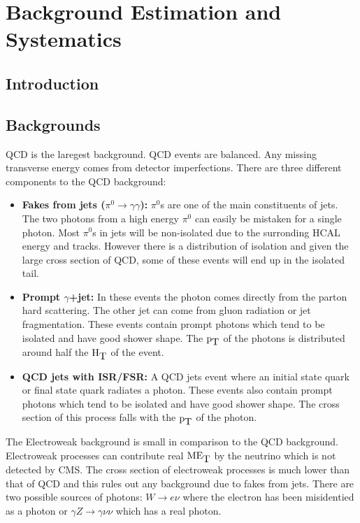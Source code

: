 \chapter{Background Estimation and Systematics}

\section{Introduction}

\section{Backgrounds}

QCD is the laregest background. QCD events are balanced. Any missing transverse
energy comes from detector imperfections. There are three different components 
to the QCD background:

\begin{itemize}
\item {\bf Fakes from jets ($\pi^{0}\rightarrow\gamma\gamma$):} $\pi^{0}$s are
one of the main constituents of jets. The two photons from a high energy 
$\pi^{0}$ can easily be mistaken for a single photon. Most $\pi^{0}$s in jets
will be non-isolated due to the surronding HCAL energy and tracks. However
there is a distribution of isolation and given the large cross section of QCD, 
some of these events will end up in the isolated tail.
\item {\bf Prompt $\gamma$+jet:} In these events the photon comes directly from
the parton hard scattering. The other jet can come from gluon radiation or
jet fragmentation. These events contain prompt photons which tend to be isolated
and have good shower shape. The $\mbox{p}_{\mbox{T}}$ of the photons is distributed around half
the $\mbox{H}_{\mbox{T}}$ of the event.
\item {\bf QCD jets with ISR/FSR:} A QCD jets event where an initial state quark
or final state quark radiates a photon. These events also contain prompt photons
which tend to be isolated and have good shower shape. The cross section of this 
process falls with the $\mbox{p}_{\mbox{T}}$ of the photon. 
\end{itemize}

The Electroweak background is small in comparison to the QCD background.
Electroweak processes can contribute real $\mbox{ME}_{\mbox{T}}$ by the neutrino which is not
detected by CMS. The cross section of electroweak processes is much lower than
that of QCD and this rules out any background due to fakes from jets. There are
two possible sources of photons: $W\rightarrow e\nu$ where the electron has been
misidentied as a photon or $\gamma Z\rightarrow\gamma\nu\nu$ which has a real
photon. \\

